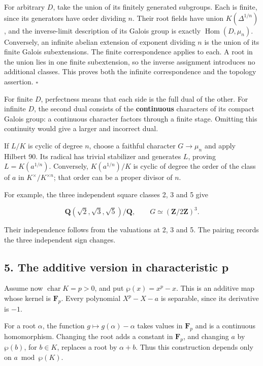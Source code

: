 \documentclass[11pt,a4paper]{article}
\begin{document}
For arbitrary \(D\), take the union of its finitely generated subgroups.
Each is finite, since its generators have order dividing \(n\). Their
root fields have union \(K(\Delta^{1/n})\), and the inverse-limit
description of its Galois group is exactly
\(\operatorname{Hom}(D,\mu_n)\). Conversely, an infinite abelian
extension of exponent dividing \(n\) is the union of its finite Galois
subextensions. The finite correspondence applies to each. A root in the
union lies in one finite subextension, so the inverse assignment
introduces no additional classes. This proves both the infinite
correspondence and the topology assertion. \(\square\)

For finite \(D\), perfectness means that each side is the full dual of
the other. For infinite \(D\), the second dual consists of the
\textbf{continuous} characters of its compact Galois group: a continuous
character factors through a finite stage. Omitting this continuity would
give a larger and incorrect dual.

If \(L/K\) is cyclic of degree \(n\), choose a faithful character
\(G\to\mu_n\) and apply Hilbert 90. Its radical has trivial stabilizer
and generates \(L\), proving \(L=K(a^{1/n})\). Conversely,
\(K(a^{1/n})/K\) is cyclic of degree the order of the class of \(a\) in
\(K^\times/K^{\times n}\); that order can be a proper divisor of \(n\).

For example, the three independent square classes 2, 3 and 5 give

\[
\mathbf Q(\sqrt2,\sqrt3,\sqrt5)/\mathbf Q,
\qquad G\simeq(\mathbf Z/2\mathbf Z)^3.
\]

Their independence follows from the valuations at 2, 3 and 5. The
pairing records the three independent sign changes.

\subsection{5. The additive version in characteristic
p}\label{the-additive-version-in-characteristic-p}

Assume now \(\operatorname{char}K=p>0\), and put \(\wp(x)=x^p-x\). This
is an additive map whose kernel is \(\mathbf F_p\). Every polynomial
\(X^p-X-a\) is separable, since its derivative is \(-1\).

For a root \(\alpha\), the function \(g\mapsto g(\alpha)-\alpha\) takes
values in \(\mathbf F_p\) and is a continuous homomorphism. Changing the
root adds a constant in \(\mathbf F_p\), and changing \(a\) by
\(\wp(b)\), for \(b\in K\), replaces a root by \(\alpha+b\). Thus this
construction depends only on \(a\bmod\wp(K)\).
\end{document}
